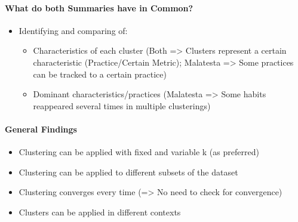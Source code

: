 \paragraph*{What do both Summaries have in Common?}
\begin{itemize}
    \item Identifying and comparing of:
    \begin{itemize}
        \item Characteristics of each cluster (Both => Clusters represent a certain characteristic (Practice/Certain Metric); Malatesta => Some practices can be tracked to a certain practice)
        \item Dominant characteristics/practices (Malatesta => Some habits reappeared several times in multiple clusterings)
    \end{itemize}
\end{itemize}

\paragraph*{General Findings}
\begin{itemize}
    \item Clustering can be applied with fixed and variable k (as preferred)
    \item Clustering can be applied to different subsets of the dataset
    \item Clustering converges every time (=> No need to check for convergence)
    \item Clusters can be applied in different contexts 
\end{itemize}

